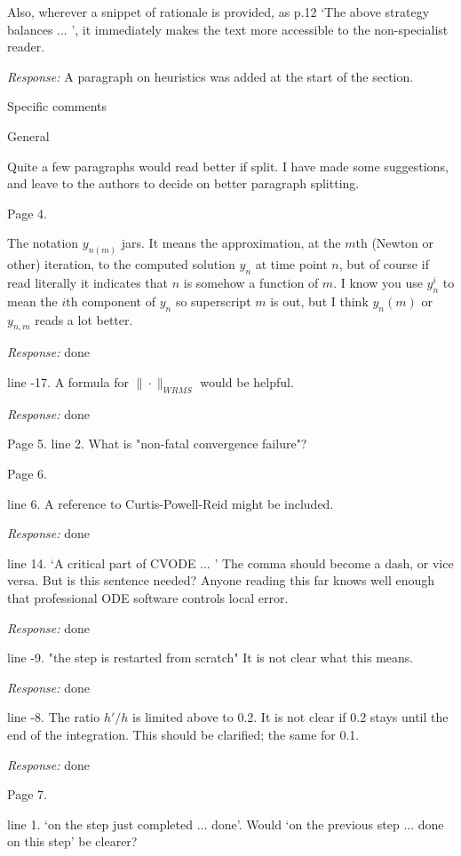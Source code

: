 Also, wherever a snippet of rationale is provided, as p.12 `The above
strategy balances ... ', it immediately makes the text more accessible
to the non-specialist reader.

{\em Response:} A paragraph on heuristics was added at the start of the section.


Specific comments 

General

Quite a few paragraphs would read better if split. I have made some
suggestions, and leave to the authors to decide on better paragraph
splitting.


Page 4. 

The notation $y_{n(m)}$ jars. It means the approximation, at the $m$th
(Newton or other) iteration, to the computed solution $y_n$ at time
point $n$, but of course if read literally it indicates that $n$ is
somehow a function of $m$.  I know you use $y^i_n$ to mean the $i$th
component of $y_n$ so superscript $m$ is out, but I think $y_n(m)$ or
$y_{n,m}$ reads a lot better.

{\em Response:} done

line -17. A formula for $\|\cdot\|_{WRMS}$ would be helpful. 

{\em Response:} done

Page 5. 
line 2. What is "non-fatal convergence failure"? 
 
Page 6.  

line 6. A reference to Curtis-Powell-Reid might be included.  

{\em Response:} done

line 14. `A critical part of CVODE ... ' The comma should become a
dash, or vice versa.  But is this sentence needed? Anyone reading this
far knows well enough that professional ODE software controls local error.

{\em Response:} done

line -9. "the step is restarted from scratch" It is not clear what this means.

{\em Response:} done

line -8. The ratio $h'/h$ is limited above to 0.2. It is not clear if
0.2 stays until the end of the integration. This should be clarified;
the same for 0.1.

{\em Response:} done
 
Page 7.  

line 1. `on the step just completed ... done'. Would `on the previous step ... 
done on this step' be clearer?  

